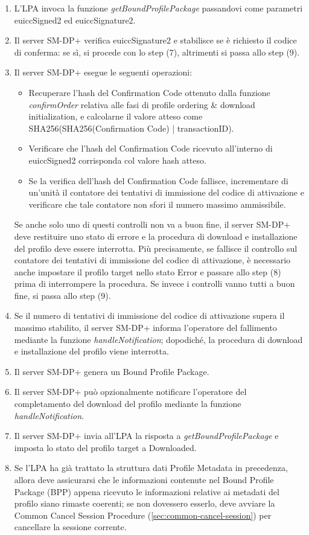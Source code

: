 \documentclass[10pt, oneside]{book}
\begin{document}
\begin{enumerate}
\item L'LPA invoca la funzione \textit{getBoundProfilePackage} passandovi come parametri euiccSigned2 ed euiccSignature2.
\item Il server SM-DP+ verifica euiccSignature2 e stabilisce se è richiesto il codice di conferma: se sì, si procede con lo step (7), altrimenti si passa allo step (9).
\item Il server SM-DP+ esegue le seguenti operazioni:
\begin{itemize}[itemsep=0pt]
\item Recuperare l'hash del Confirmation Code ottenuto dalla funzione \textit{confirmOrder} relativa alle fasi di profile ordering \& download initialization, e calcolarne il valore atteso come SHA256(SHA256(Confirmation Code) | transactionID).
\item Verificare che l'hash del Confirmation Code ricevuto all'interno di euiccSigned2 corrisponda col valore hash atteso.
\item Se la verifica dell'hash del Confirmation Code fallisce, incrementare di un'unità il contatore dei tentativi di immissione del codice di attivazione e verificare che tale contatore non sfori il numero massimo ammissibile.
\end{itemize}
Se anche solo uno di questi controlli non va a buon fine, il server SM-DP+ deve restituire uno stato di errore e la procedura di download e installazione del profilo deve essere interrotta. Più precisamente, se fallisce il controllo sul contatore dei tentativi di immissione del codice di attivazione, è necessario anche impostare il profilo target nello stato Error e passare allo step (8) prima di interrompere la procedura. Se invece i controlli vanno tutti a buon fine, si passa allo step (9).
\item Se il numero di tentativi di immissione del codice di attivazione supera il massimo stabilito, il server SM-DP+ informa l'operatore del fallimento mediante la funzione \textit{handleNotification}; dopodiché, la procedura di download e installazione del profilo viene interrotta.
\item Il server SM-DP+ genera un Bound Profile Package.
\item Il server SM-DP+ può opzionalmente notificare l'operatore del completamento del download del profilo mediante la funzione \textit{handleNotification}.
\item Il server SM-DP+ invia all'LPA la risposta a \textit{getBoundProfilePackage} e imposta lo stato del profilo target a Downloaded.
\item Se l'LPA ha già trattato la struttura dati Profile Metadata in precedenza, allora deve assicurarsi che le informazioni contenute nel Bound Profile Package (BPP) appena ricevuto le informazioni relative ai metadati del profilo siano rimaste coerenti; se non dovessero esserlo, deve avviare la Common Cancel Session Procedure (\ref{sec:common-cancel-session}) per cancellare la sessione corrente.

\end{enumerate}
\end{document}
